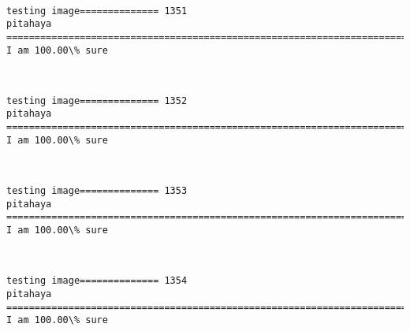 \documentclass[11pt]{article}
\begin{document}
    \begin{center}
    \end{center}
    { \hspace*{\fill} \\}
    
    \begin{Verbatim}[commandchars=\\\{\}]
testing image============== 1351
pitahaya
============================================================================
I am 100.00\% sure

    \end{Verbatim}

    \begin{center}
    \end{center}
    { \hspace*{\fill} \\}
    
    \begin{Verbatim}[commandchars=\\\{\}]
testing image============== 1352
pitahaya
============================================================================
I am 100.00\% sure

    \end{Verbatim}

    \begin{center}
    \end{center}
    { \hspace*{\fill} \\}
    
    \begin{Verbatim}[commandchars=\\\{\}]
testing image============== 1353
pitahaya
============================================================================
I am 100.00\% sure

    \end{Verbatim}

    \begin{center}
    \end{center}
    { \hspace*{\fill} \\}
    
    \begin{Verbatim}[commandchars=\\\{\}]
testing image============== 1354
pitahaya
============================================================================
I am 100.00\% sure

    \end{Verbatim}
\end{document}
